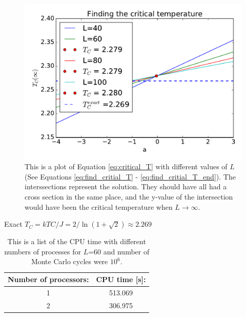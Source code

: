 \begin{figure}[H]
\includegraphics[width=\linewidth]{../results/4f/critical_t}\caption{This is a plot of Equation \ref{eq:critical_T} with different values of $L$ (See Equations \ref{eq:find_critial_T} - \ref{eq:find_critial_T_end}). The interssections represent the solution. They should have all had a cross section in the same place, and the y-value of the intersection would have been the critical temperature when $L \rightarrow \infty$.}\label{fig:critical_T}
\end{figure}

Exact $T_C =  kTC/J = 2/ \ln(1+\sqrt{
2}) \approx 2.269$ \cite{Onsager}

\begin{table}\caption{This is a list of the CPU time with different numbers of processes for $L$=60 and number of Monte Carlo cycles were $10^6$.}\label{tab:CPU}
\begin{tabular}{cc}
Number of processors:& CPU time [s]: \\ \hline
 1 & 513.069\\
 2 & 306.975\\
\end{tabular}
\end{table}